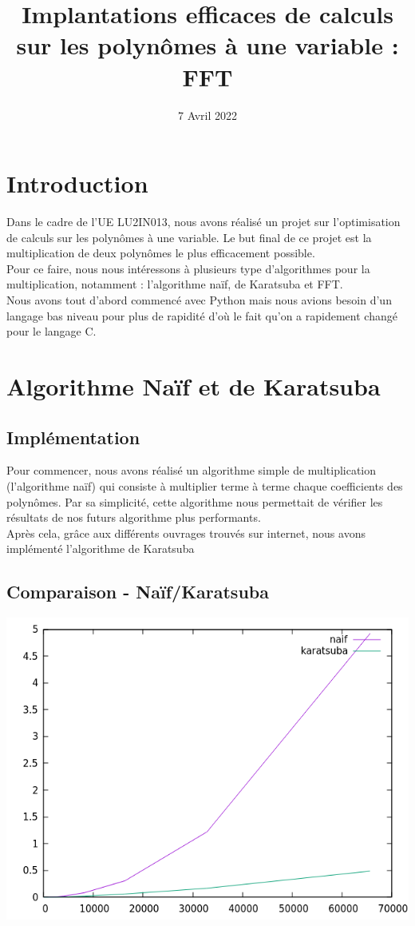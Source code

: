 \documentclass[12pt, a4paper]{article}
\title{Implantations efficaces de calculs sur les polynômes à une variable : FFT}
\author{}
\date{7 Avril 2022}
\begin{document}
\maketitle
\tableofcontents
\newpage

\section*{Introduction}
Dans le cadre de l'UE LU2IN013, nous avons réalisé un projet sur l'optimisation de calculs sur les polynômes à une variable. Le but final de ce projet est la multiplication de deux polynômes le plus efficacement possible.\\
Pour ce faire, nous nous intéressons à plusieurs type d'algorithmes pour la multiplication, notamment : l'algorithme naïf, de Karatsuba et FFT.\\
Nous avons tout d'abord commencé avec Python mais nous avions besoin d'un langage bas niveau pour plus de rapidité d'où le fait qu'on a rapidement changé pour le langage C.\\


\section{Algorithme Naïf et de Karatsuba}
\subsection{Implémentation}
Pour commencer, nous avons réalisé un algorithme simple de multiplication (l'algorithme naïf) qui consiste à multiplier terme à terme chaque coefficients des polynômes. Par sa simplicité, cette algorithme nous permettait de vérifier les résultats de nos futurs algorithme plus performants.\\
Après cela, grâce aux différents ouvrages 
trouvés sur internet, nous avons implémenté l'algorithme de Karatsuba 
\subsection{Comparaison - Naïf/Karatsuba}

\includegraphics[scale=1]{naif_kara}\\
\end{document}
